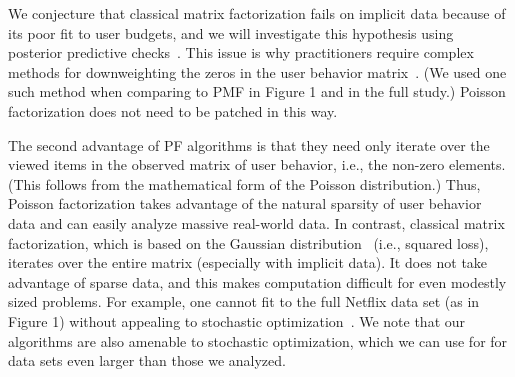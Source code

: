 We conjecture that classical matrix factorization fails on implicit
data because of its poor fit to user budgets, and we will investigate
this hypothesis using posterior predictive checks~\cite{Gelman:1996}.
This issue is why practitioners require complex methods for
downweighting the zeros in the user behavior
matrix~\cite{Hu:2008p9402,Gantner:2012p9364,Dror:2012a,Paquet:2013p9197}.
(We used one such method when comparing to PMF in Figure 1 and in the
full study.)  Poisson factorization does not need to be patched in
this way.

The second advantage of PF algorithms is that they need only iterate
over the viewed items in the observed matrix of user behavior, i.e.,
the non-zero elements.  (This follows from the mathematical form of
the Poisson distribution.)  Thus, Poisson factorization takes
advantage of the natural sparsity of user behavior data and can easily
analyze massive real-world data.  In contrast, classical matrix
factorization, which is based on the Gaussian
distribution~\cite{Salakhutdinov:2008} (i.e., squared loss), iterates
over the entire matrix (especially with implicit data).  It does not
take advantage of sparse data, and this makes computation difficult
for even modestly sized problems.  For example, one cannot fit to the
full Netflix data set (as in Figure 1) without appealing to stochastic
optimization~\cite{Mairal:2010}.  We note that our algorithms are also
amenable to stochastic optimization, which we can use for for data
sets even larger than those we analyzed.

